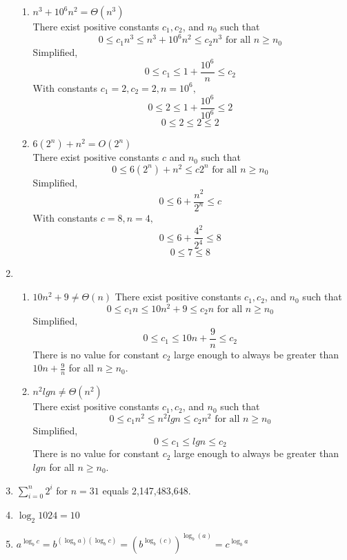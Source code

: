 \documentclass[a4paper]{article}
\begin{document}
\begin{enumerate}
\begin{enumerate}[label=\alph*)]
            \item $n^{3}+10^{6}n^{2}=\Theta(n^{3})$ \\
            There exist positive constants $c_1, c_2$, and $n_0$ such that 
            $$0 \leq c_1n^{3} \leq n^{3}+10^{6}n^{2} \leq c_2n^{3} \text{ for all } n \geq n_0$$
            Simplified,
            $$0 \leq c_1 \leq 1+\frac{10^6}{n} \leq c_2$$
            With constants $c_1 = 2, c_2 = 2, n = 10^{6},$
            $$0 \leq 2 \leq 1+\frac{10^{6}}{10^{6}} \leq 2$$
            $$0 \leq 2 \leq 2 \leq 2$$
    
            \item $6(2^{n}) + n^{2} = O(2^{n})$ \\
            There exist positive constants $c$ and $n_0$ such that 
            $$0 \leq 6(2^{n}) + n^{2} \leq c2^{n} \text{ for all } n \geq n_0$$
            Simplified,
            $$0 \leq 6+\frac{n^{2}}{2^{n}} \leq c$$
            With constants $c = 8, n = 4,$
            $$0 \leq 6+\frac{4^{2}}{2^{4}} \leq 8$$
            $$0 \leq 7 \leq 8$$
        
        \end{enumerate}

        \newpage
        \item
        \begin{enumerate}[label=\alph*)]
            
            \item $10n^{2}+9 \neq \Theta(n)$ 
            There exist positive constants $c_1, c_2$, and $n_0$ such that 
            $$0 \leq c_1n \leq 10n^{2}+9 \leq c_2n \text{ for all } n \geq n_0$$
            Simplified,
            $$0 \leq c_1 \leq 10n+\frac{9}{n} \leq c_2$$
            There is no value for constant $c_2$ large enough to always be greater than 
            $10n+\frac{9}{n}$ for all $n \geq n_0$.

            \vspace{1cm}

            \item $n^{2}lg n \neq \Theta (n^{2})$ \\
            There exist positive constants $c_1, c_2$, and $n_0$ such that 
            $$0 \leq c_1n^{2} \leq n^{2}lg n \leq c_2n^{2} \text{ for all } n \geq n_0$$
            Simplified,
            $$0 \leq c_1 \leq lg n \leq c_2$$
            There is no value for constant $c_2$ large enough to always be greater than 
            $lgn$ for all $n \geq n_0$.
        
        \end{enumerate}

        \vspace{1cm}

        \item $\sum_{i=0}^{n}2^{i}$ for $n=31$ equals 2,147,483,648.
        

        \item $\log_2 1024 = 10$
        

        \item $a^{\log_b c} = b^{(\log_b a)(\log_b c)} = (b^{\log_b (c)})^{\log_b (a)} = c^{\log_b a}$
        
    \end{enumerate}
\end{document}
